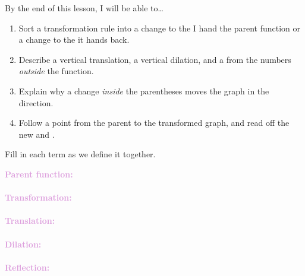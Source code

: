 \documentclass[10pt]{article}
\begin{document}

\vspace{0.12in}

\begin{objectivebox}
By the end of this lesson, I will be able to\ldots
\begin{enumerate}[itemsep=2pt]
  \item Sort a transformation rule into a change to the \blank{2.4cm} I hand
        the parent function or a change to the \blank{2.4cm} it hands back.
  \item Describe a vertical translation, a vertical dilation, and a
        \blank{2.4cm} from the numbers \textit{outside} the function.
  \item Explain why a change \textit{inside} the parentheses moves the graph
        in the \blank{2.4cm} direction.
  \item Follow a \blank{2.4cm} point from the parent to the transformed graph,
        and read off the new \blank{2cm} and \blank{1.6cm}.
\end{enumerate}
\end{objectivebox}

\vspace{0.1in}

\boxguard
\begin{vocabbox}
Fill in each term as we define it together.
\par\vspace{2pt}
\noindent\textbf{\textcolor{plum}{Parent function:}}\\[1pt]
\writeline\\[3pt]
\noindent\textbf{\textcolor{plum}{Transformation:}}\\[1pt]
\writeline\\[3pt]
\noindent\textbf{\textcolor{plum}{Translation:}}\\[1pt]
\writeline\\[3pt]
\noindent\textbf{\textcolor{plum}{Dilation:}}\\[1pt]
\writeline\\[3pt]
\noindent\textbf{\textcolor{plum}{Reflection:}}\\[1pt]
\writeline
\end{vocabbox}

\vspace{0.1in}
\end{document}
